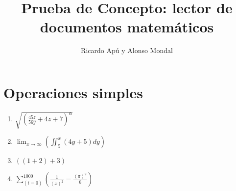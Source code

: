 \documentclass[11pt]{article}
\title{Prueba de Concepto: lector de documentos matemáticos}
\author{Ricardo Apú y Alonso Mondal}
\begin{document}
\maketitle
\section{Operaciones simples}
\begin{enumerate}
\item {$\sqrt{(\frac{45z}{56y} + 4z + 7)^{\alpha}}$}
\item {$\lim_{x \to \infty} (\iint_{5}^{x} (4y+5) dy)$}
\item{$((1+2)+3)$}
\item{$\sum_{(i=0)}^{1000} (\frac{1}{(x)^{2}} = \frac{(\pi)^{2}}{6})$}
\end{enumerate}
\end{document}
